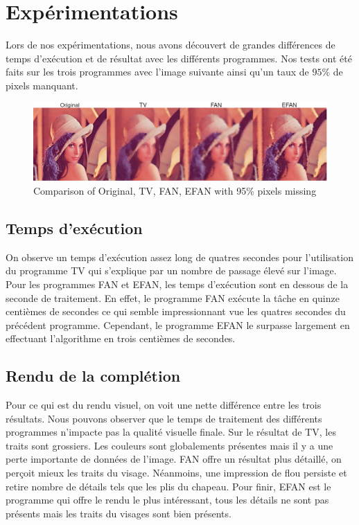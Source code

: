 \documentclass[]{article}
\begin{document}
\newpage

\hypertarget{expuxe9rimentations}{%
\section{Expérimentations}\label{expuxe9rimentations}}

Lors de nos expérimentations, nous avons découvert de grandes
différences de temps d'exécution et de résultat avec les différents
programmes. Nos tests ont été faits sur les trois programmes avec
l'image suivante ainsi qu'un taux de \(95\%\) de pixels manquant.

\begin{figure}
\centering
\includegraphics{img/comparison.png}
\caption{Comparison of Original, TV, FAN, EFAN with 95\% pixels missing}
\end{figure}

\hypertarget{temps-dexuxe9cution}{%
\subsection{Temps d'exécution}\label{temps-dexuxe9cution}}

On observe un temps d'exécution assez long de quatres secondes pour
l'utilisation du programme TV qui s'explique par un nombre de passage
élevé sur l'image. Pour les programmes FAN et EFAN, les temps
d'exécution sont en dessous de la seconde de traitement. En effet, le
programme FAN exécute la tâche en quinze centièmes de secondes ce qui
semble impressionnant vue les quatres secondes du précédent programme.
Cependant, le programme EFAN le surpasse largement en effectuant
l'algorithme en trois centièmes de secondes.

\hypertarget{rendu-de-la-compluxe9tion}{%
\subsection{Rendu de la complétion}\label{rendu-de-la-compluxe9tion}}

Pour ce qui est du rendu visuel, on voit une nette différence entre les
trois résultats. Nous pouvons observer que le temps de traitement des
différents programmes n'impacte pas la qualité visuelle finale. Sur le
résultat de TV, les traits sont grossiers. Les couleurs sont
globalements présentes mais il y a une perte importante de données de
l'image. FAN offre un résultat plus détaillé, on perçoit mieux les
traits du visage. Néanmoins, une impression de flou persiste et retire
nombre de détails tels que les plis du chapeau. Pour finir, EFAN est le
programme qui offre le rendu le plus intéressant, tous les détails ne
sont pas présents mais les traits du visages sont bien présents.
\end{document}
